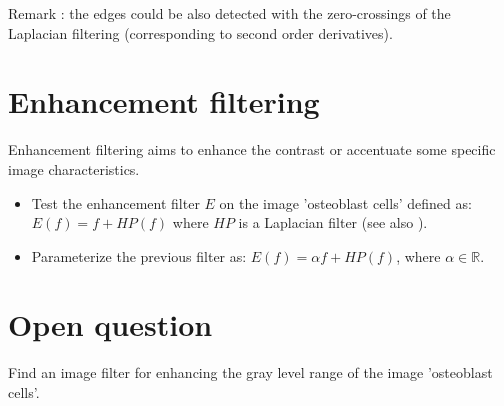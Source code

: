 Remark : the edges could be also detected with the zero-crossings of the Laplacian filtering  (corresponding to second order derivatives).

 

\section{Enhancement filtering}
Enhancement filtering aims to enhance the contrast or accentuate some specific image characteristics.
\begin{qbox}
\begin{itemize}
	\item Test the enhancement filter $E$ on the image 'osteoblast cells' defined as:
	$E(f)=f+HP(f)$ where $HP$ is a Laplacian filter (see also  ).
	\item Parameterize the previous filter as:
	$E(f)=\alpha f+HP(f)$, where $\alpha\in\mathbb{R}$.
\end{itemize}
\end{qbox}

\section{Open question}
Find an image filter for enhancing the gray level range of the image 'osteoblast cells'.

